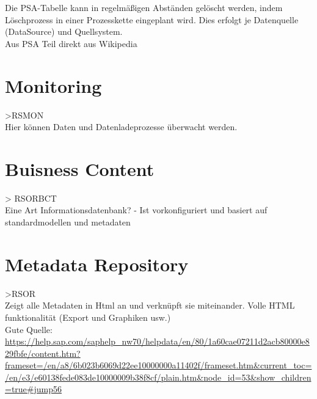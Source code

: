 Die PSA-Tabelle kann in regelmäßigen Abständen gelöscht werden, indem Löschprozess in einer Prozesskette eingeplant wird. Dies erfolgt je Datenquelle (DataSource) und Quellsystem. \\ 
Aus PSA Teil direkt aus Wikipedia

\chapter{Monitoring}
>RSMON\\
Hier können Daten und Datenladeprozesse überwacht werden.

\chapter{Buisness Content}
> RSORBCT\\
Eine Art Informationsdatenbank?
- Ist vorkonfiguriert und basiert auf standardmodellen und metadaten

\chapter{Metadata Repository}
>RSOR\\
Zeigt alle Metadaten in Html an und verknüpft sie miteinander. Volle HTML funktionalität (Export und Graphiken usw.)\\

Gute Quelle:
\url{https://help.sap.com/saphelp_nw70/helpdata/en/80/1a60cae07211d2acb80000e829fbfe/content.htm?frameset=/en/a8/6b023b6069d22ee10000000a11402f/frameset.htm&current_toc=/en/e3/e60138fede083de10000009b38f8cf/plain.htm&node_id=53&show_children=true#jump56}




